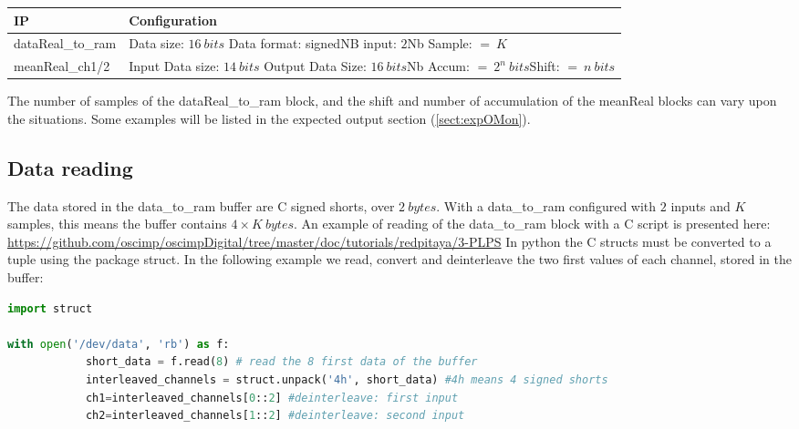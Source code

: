 \documentclass[12pt,oneside]{article}
\begin{document}
\begin{center}
	\begin{tabular}{|>{\centering\arraybackslash}m{.3\linewidth} | >{\centering\arraybackslash}m{.3\linewidth} |}
		\hline
		IP & Configuration \\
		\hline
		dataReal\_to\_ram&Data size: $16~bits$ \newline Data format: signed\newline NB input: $2$\newline Nb Sample: $=~K$\\
		\hline
		meanReal\_ch1/2&Input Data size: $14~bits$ \newline Output Data Size: $16~bits$\newline Nb Accum: $=~2^n~bits$\newline Shift: $=~n~bits$\\
		\hline
	\end{tabular}
\end{center}
\vspace{0.2cm}

The number of samples of the dataReal\_to\_ram block, and the shift and number of accumulation of the meanReal blocks can vary upon the situations. Some examples will be listed in the expected output section (\ref*{sect:expOMon}). 

\subsection{Data reading}\label{sect:datareading}

The data stored in the data\_to\_ram buffer are C signed shorts, over $2~bytes$. With a data\_to\_ram configured with $2$ inputs and $K$ samples, this means the buffer contains ${4\times K~bytes}$. An example of reading of the data\_to\_ram block with a C script is presented here:
\newline
\href{https://github.com/oscimp/oscimpDigital/tree/master/doc/tutorials/redpitaya/3-PLPS}{https://github.com/oscimp/oscimpDigital/tree/master/doc/tutorials/redpitaya/3-PLPS}
\newline\newline
In python the C structs must be converted to a tuple using the package struct. In the following example we read, convert and deinterleave the two first values of each channel, stored in the buffer:

\begin{lstlisting}[language=Python]
import struct

with open('/dev/data', 'rb') as f:
			short_data = f.read(8) # read the 8 first data of the buffer
			interleaved_channels = struct.unpack('4h', short_data) #4h means 4 signed shorts
			ch1=interleaved_channels[0::2] #deinterleave: first input
			ch2=interleaved_channels[1::2] #deinterleave: second input
\end{lstlisting}
\vspace{0.6cm}
\end{document}
